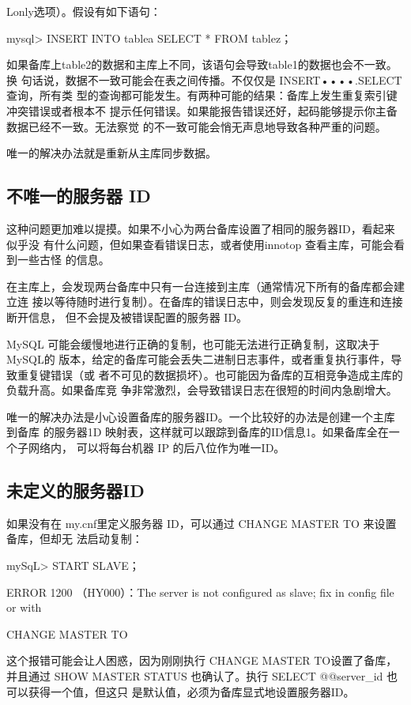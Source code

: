 Lonly选项）。假设有如下语句：

mysql> INSERT INTO tablea SELECT * FROM tablez；

如果备库上table2的数据和主库上不同，该语句会导致table1的数据也会不一致。换
句话说，数据不一致可能会在表之间传播。不仅仅是 INSERT••••.SELECT 查询，所有类
型的查询都可能发生。有两种可能的结果：备库上发生重复索引键冲突错误或者根本不
提示任何错误。如果能报告错误还好，起码能够提示你主备数据已经不一致。无法察觉
的不一致可能会悄无声息地导致各种严重的问题。

唯一的解决办法就是重新从主库同步数据。

\subsection{不唯一的服务器 ID}
这种问题更加难以提摸。如果不小心为两台备库设置了相同的服务器ID，看起来似乎没
有什么问题，但如果查看错误日志，或者使用innotop 查看主库，可能会看到一些古怪
的信息。

在主库上，会发现两台备库中只有一台连接到主库（通常情况下所有的备库都会建立连
接以等待随时进行复制）。在备库的错误日志中，则会发现反复的重连和连接断开信息，
但不会提及被错误配置的服务器 ID。

MySQL 可能会缓慢地进行正确的复制，也可能无法进行正确复制，这取决于MySQL的
版本，给定的备库可能会丢失二进制日志事件，或者重复执行事件，导致重复键错误（或
者不可见的数据损坏）。也可能因为备库的互相竞争造成主库的负载升高。如果备库竞
争非常激烈，会导致错误日志在很短的时间内急剧增大。

唯一的解决办法是小心设置备库的服务器ID。一个比较好的办法是创建一个主库到备库
的服务器1D 映射表，这样就可以跟踪到备库的ID信息1。如果备库全在一个子网络内，
可以将每台机器 IP 的后八位作为唯一ID。

\subsection{未定义的服务器ID}
如果没有在 my.cnf里定义服务器 ID，可以通过 CHANGE MASTER TO 来设置备库，但却无
法启动复制：

mySqL> START SLAVE；

ERROR 1200 （HY000）：The server is not configured as slave; fix in config file or with

CHANGE MASTER TO

这个报错可能会让人困惑，因为刚刚执行 CHANGE MASTER TO设置了备库，并且通过
SHOW MASTER STATUS 也确认了。执行 SELECT @@server\_id 也可以获得一个值，但这只
是默认值，必须为备库显式地设置服务器ID。

